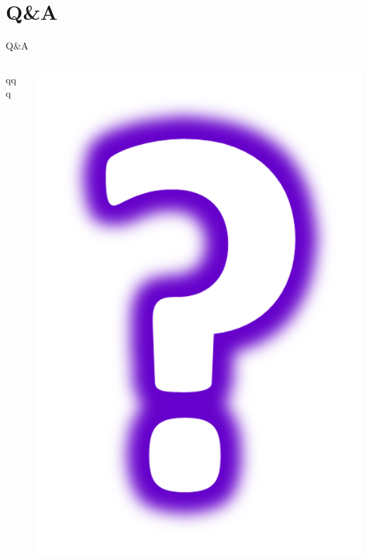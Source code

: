 \section{Q\&A}
\begin{frame}{Q\&A}
\begin{columns}
\begin{column}{0.5\textwidth}

qqq  
\end{column}
\begin{column}{0.5\textwidth}

\begin{center}
 \includegraphics[scale=0.4]{images/question.png}   
\end{center}
\end{column}
\end{columns}
\end{frame}